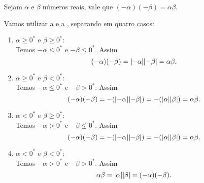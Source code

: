 \documentclass[../main.tex]{subfiles}
\begin{document}
\begin{prop}\label{reais-teo-regraSinaisProduto2}
    Sejam $\alpha$ e $\beta$ números reais, vale que $\left( -\alpha \right) \left( -\beta \right) = \alpha \beta$.
\end{prop}
\begin{dem}
    Vamos utilizar a  e a , separando em quatro casos:
    \begin{enumerate}
        \item $\alpha \geq 0^*$ e $\beta \geq 0^*$: \\
            Temos $-\alpha \leq 0^*$ e $-\beta \leq 0^*$. Assim
            \[ (-\alpha)(-\beta) = \abs{-\alpha}\abs{-\beta} = \alpha\beta.\]
        
        \item $\alpha \geq 0^*$ e $\beta < 0^*$: \\
        Temos $-\alpha \leq 0^*$ e $-\beta > 0^*$. Assim
            \[ (-\alpha)(-\beta) = -(\abs{-\alpha}\abs{-\beta}) = -(\abs{\alpha}\abs{\beta}) = \alpha\beta .\]
        \item $\alpha < 0^*$ e $\beta \geq 0^*$: \\
         Temos $-\alpha > 0^*$ e $-\beta \leq 0^*$. Assim
         \[ (-\alpha)(-\beta) = -(\abs{-\alpha}\abs{-\beta}) = -(\abs{\alpha}\abs{\beta}) = \alpha\beta .\]
        \item $\alpha < 0^*$ e $\beta < 0^*$: \\
            Temos $-\alpha > 0^*$ e $-\beta > 0^*$. Assim
            \[\alpha\beta = \abs{\alpha}\abs{\beta} = (-\alpha)(-\beta). \]
    \end{enumerate}
\end{dem}
\end{document}
